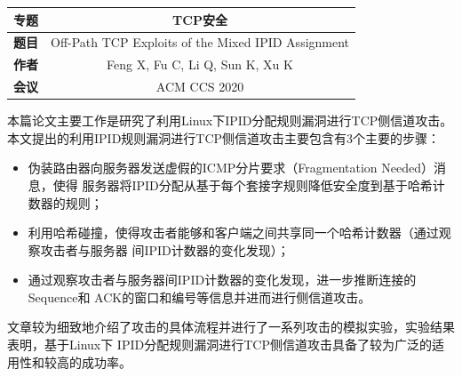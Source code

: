 \documentclass[a4paper]{article}
\begin{document}
\courseheader
{}

\info


  
\vspace{-15pt}
\begin{center}
  \begin{tabular}{c|c} \toprule
    \textbf{专题} &TCP安全 \\\midrule
    \textbf{题目} &Off-Path TCP Exploits of the Mixed IPID Assignment\\
    \textbf{作者} &Feng X, Fu C, Li Q, Sun K, Xu K\\
    \textbf{会议} &ACM CCS 2020\\\bottomrule
  \end{tabular}
\end{center}
  
\vspace{20pt}
\setlength{\parindent}{2em}
本篇论文主要工作是研究了利用Linux下IPID分配规则漏洞进行TCP侧信道攻击。
本文提出的利用IPID规则漏洞进行TCP侧信道攻击主要包含有3个主要的步骤：
\begin{itemize}
  \item 伪装路由器向服务器发送虚假的ICMP分片要求（Fragmentation Needed）消息，使得
    服务器将IPID分配从基于每个套接字规则降低安全度到基于哈希计数器的规则；
  \item 利用哈希碰撞，使得攻击者能够和客户端之间共享同一个哈希计数器（通过观察攻击者与服务器
  间IPID计数器的变化发现）；
  \item 通过观察攻击者与服务器间IPID计数器的变化发现，进一步推断连接的Sequence和
  ACK的窗口和编号等信息并进而进行侧信道攻击。
\end{itemize}

文章较为细致地介绍了攻击的具体流程并进行了一系列攻击的模拟实验，实验结果表明，基于Linux下
IPID分配规则漏洞进行TCP侧信道攻击具备了较为广泛的适用性和较高的成功率。
\end{document}
